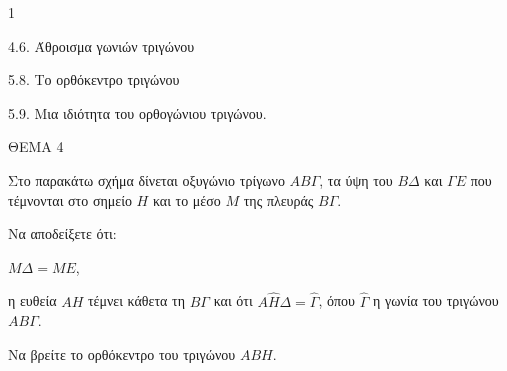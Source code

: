 \begin{ylh}{1}
    \item 4.6. Άθροισμα γωνιών τριγώνου
    \item 5.8. Το ορθόκεντρο τριγώνου
    \item 5.9. Μια ιδιότητα του ορθογώνιου τριγώνου.
\end{ylh}

ΘΕΜΑ 4

Στο παρακάτω σχήμα δίνεται οξυγώνιο τρίγωνο $ΑΒ\Gamma$, τα ύψη του $Β\Delta$ και $\Gamma E$ που τέμνονται στο σημείο $H$ και το μέσο $M$ της πλευράς $B\Gamma$.

\begin{alist}
\item Να αποδείξετε ότι:
\begin{alist}
\item $M\Delta = ME$, 
\item η ευθεία $AH$ τέμνει κάθετα τη $B\Gamma$ και ότι $A\widehat{H}\Delta = \widehat{\Gamma}$, όπου $\widehat{\Gamma}$ η γωνία του τριγώνου $ΑΒ\Gamma$. 
\end{alist}
\item Να βρείτε το ορθόκεντρο του τριγώνου $ABH$. 

\begin{center}
\end{center}
\end{alist}

